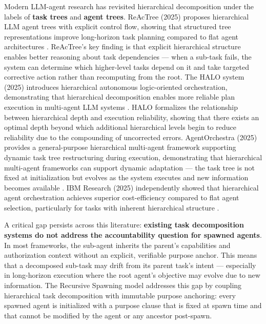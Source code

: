 {{Modern LLM-agent research has revisited hierarchical decomposition under the labels of \textbf{task trees} and \textbf{agent trees}. ReAcTree (2025) proposes hierarchical LLM agent trees with explicit control flow, showing that structured tree representations improve long-horizon task planning compared to flat agent architectures \cite{reactree2025}. ReAcTree's key finding is that explicit hierarchical structure enables better reasoning about task dependencies — when a sub-task fails, the system can determine which higher-level tasks depend on it and take targeted corrective action rather than recomputing from the root. The HALO system (2025) introduces hierarchical autonomous logic-oriented orchestration, demonstrating that hierarchical decomposition enables more reliable plan execution in multi-agent LLM systems \cite{halo2025}. HALO formalizes the relationship between hierarchical depth and execution reliability, showing that there exists an optimal depth beyond which additional hierarchical levels begin to reduce reliability due to the compounding of uncorrected errors. AgentOrchestra (2025) provides a general-purpose hierarchical multi-agent framework supporting dynamic task tree restructuring during execution, demonstrating that hierarchical multi-agent frameworks can support dynamic adaptation — the task tree is not fixed at initialization but evolves as the system executes and new information becomes available \cite{agentorchestra2025}. IBM Research (2025) independently showed that hierarchical agent orchestration achieves superior cost-efficiency compared to flat agent selection, particularly for tasks with inherent hierarchical structure \cite{ibm2025hierarchical}.

A critical gap persists across this literature: \textbf{existing task decomposition systems do not address the accountability question for spawned agents}. In most frameworks, the sub-agent inherits the parent's capabilities and authorization context without an explicit, verifiable purpose anchor. This means that a decomposed sub-task may drift from its parent task's intent — especially in long-horizon execution where the root agent's objective may evolve due to new information. The Recursive Spawning model addresses this gap by coupling hierarchical task decomposition with immutable purpose anchoring: every spawned agent is initialized with a purpose clause that is fixed at spawn time and that cannot be modified by the agent or any ancestor post-spawn.

}}
